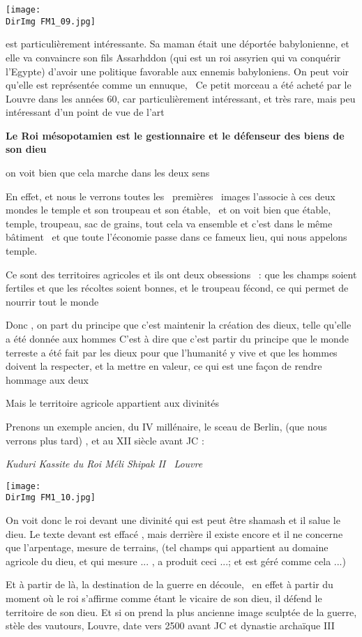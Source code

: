 \documentclass[a4paper]{article}
\newcommand{\DirImg}{../img/FaivreMartin/}
\begin{document}
\texttt{[image: \\DirImg FM1\_09.jpg]} 


est particulièrement intéressante. Sa maman était une déportée babylonienne, et elle va convaincre son fils Assarhddon
(qui est un roi assyrien qui va conquérir l'Egypte) d'avoir une politique favorable aux ennemis babyloniens. On peut
voir qu'elle est représentée comme un ennuque, \ Ce petit morceau a été acheté par le Louvre dans les années 60, car
particulièrement intéressant, et très rare, mais peu intéressant d'un point de vue de l'art


\textbf{Le Roi mésopotamien est le gestionnaire et le défenseur des biens de son dieu}


on voit bien que cela marche dans les deux sens

En effet, et nous le verrons toutes les \ premières \ images l'associe à ces deux mondes le temple et son troupeau et
son étable, \ et on voit bien que étable, temple, troupeau, sac de grains, tout cela va ensemble et c'est dans le même
bâtiment \ et que toute l'économie passe dans ce fameux lieu, qui nous appelons temple.


Ce sont des territoires agricoles et ils ont deux obsessions \ : que les champs soient fertiles et que les récoltes
soient bonnes, et le troupeau fécond, ce qui permet de nourrir tout le monde


Donc , on part du principe que c'est maintenir la création des dieux, telle qu'elle a été donnée aux hommes C'est à dire
que c'est partir du principe que le monde terreste a été fait par les dieux pour que l'humanité y vive et que les
hommes doivent la respecter, et la mettre en valeur, ce qui est une façon de rendre hommage aux deux

Mais le territoire agricole appartient aux divinités


Prenons un exemple ancien, du IV millénaire, le sceau de Berlin, (que nous verrons plus tard) , et au XII siècle avant
JC :


\textit{Kuduri Kassite du Roi Méli Shipak II \ Louvre}


\texttt{[image: \\DirImg FM1\_10.jpg]} 

On voit donc le roi devant une divinité qui est peut être shamash et il salue le dieu. Le texte devant est effacé , mais
derrière il existe encore et il ne concerne que l'arpentage, mesure de terrains, (tel champs qui appartient au domaine
agricole du dieu, et qui mesure ... , a produit ceci ...; et est géré comme cela ...)


Et à partir de là, la destination de la guerre en découle, \ en effet à partir du moment où le roi s'affirme comme étant
le vicaire de son dieu, il défend le territoire de son dieu. Et si on prend la plus ancienne image sculptée de la
guerre, stèle des vautours, Louvre, date vers 2500 avant JC et dynastie archaïque III
\end{document}
